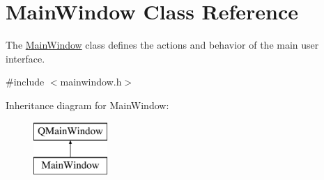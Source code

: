 \hypertarget{class_main_window}{}\section{Main\+Window Class Reference}
\label{class_main_window}


The \hyperlink{class_main_window}{Main\+Window} class defines the actions and behavior of the main user interface.  




{\ttfamily \#include $<$mainwindow.\+h$>$}

Inheritance diagram for Main\+Window\+:\begin{figure}[H]
\begin{center}
\leavevmode
\includegraphics[height=2.000000cm]{class_main_window}
\end{center}
\end{figure}
